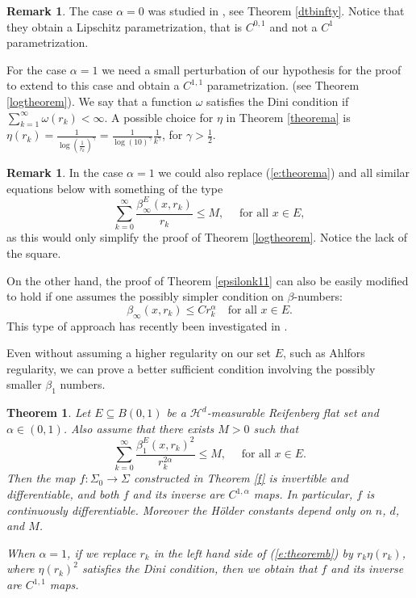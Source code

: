 \documentclass[11pt, twoside, leqno]{article}
\numberwithin{equation}{section}
\theoremstyle{plain}
\newtheorem{thmy}{Theorem}
\newenvironment{thmx}{\stepcounter{thm}\begin{thmy}}{\end{thmy}}
\theoremstyle{definition}
\newtheorem{rk}[thm]{Remark}
\begin{document}
\begin{rk}
The case $\alpha=0$ was studied in \cite{davidtoro}, see Theorem \ref{dtbinfty}. Notice that they obtain a Lipschitz parametrization, that is $C^{0,1}$ and not a $C^1$ parametrization.

For the case $\alpha=1$ we need a small perturbation of our hypothesis for the proof to extend to this case and obtain a $C^{1,1}$ parametrization. (see Theorem \ref{logtheorem}). 
We say that a function $\omega$ satisfies the Dini condition if $\sum_{k=1}^{\infty} \omega(r_k) < \infty$. A possible choice for $\eta$ in Theorem \ref{theorema} is $\eta(r_k)=\frac{1}{\log(\frac{1}{r_k})^{\gamma}}= \frac{1}{\log(10)^{\gamma}}\frac{1}{k^{\gamma}}$, for $\gamma > \frac12$.
\end{rk}

\begin{rk} \label{e:pointwisebound}
In the case $\alpha=1$ we could also replace (\ref{e:theorema}) and all similar equations below with something of the type
\begin{equation}
\sum_{k=0}^{\infty}\frac{\beta_{\infty}^E(x,r_k)}{r_k} \leq M, \quad \text{ for all $x \in E$},
\end{equation}
as this would only simplify the proof of Theorem \ref{logtheorem}. Notice the lack of the square.

On the other hand, the proof of Theorem \ref{epsilonk11} can also be easily modified to hold if one assumes the possibly simpler condition on $\beta$-numbers:
\begin{equation}
\beta_{\infty}(x,r_k) \leq C r_k^{\alpha} \quad \text{for all $x \in E$}.
\end{equation}
This type of approach has recently been investigated in \cite{delninobinna2019}.

\end{rk}


Even without assuming a higher regularity on our set $E$, such as Ahlfors regularity, we can prove a better sufficient condition involving the possibly smaller $\beta_1$ numbers.


\begin{thmx}\label{theoremb}
Let $E \subseteq B(0,1)$ be a $\mathcal{H}^d$-measurable Reifenberg flat set and $\alpha \in (0,1)$. Also assume that there exists $M > 0$ such that
\begin{equation} \label{e:theoremb}
\sum_{k=0}^{\infty}\frac{\beta_1^E(x,r_k)^2}{r_k^{2\alpha}} \leq M, \quad \text{ for all $x \in E$}.
\end{equation}
Then the map $f \colon \Sigma_0 \to \Sigma$ constructed in Theorem \ref{f} is invertible and differentiable, and both $f$ and its inverse are $C^{1,\alpha}$ maps. In particular, $f$ is continuously differentiable. Moreover the H\"{o}lder constants depend only on $n$, $d$, and $M$.

When $\alpha=1$, if we replace $r_k$ in the left hand side of (\ref{e:theoremb}) by $r_k\eta(r_k)$, where $\eta(r_k)^2$ satisfies the Dini condition, then we obtain that $f$ and its inverse are $C^{1,1}$ maps.
\end{thmx}
\end{document}
